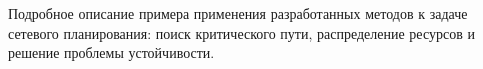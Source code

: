 Подробное описание примера применения разработанных методов к задаче сетевого планирования: поиск критического пути, распределение ресурсов и решение проблемы устойчивости.